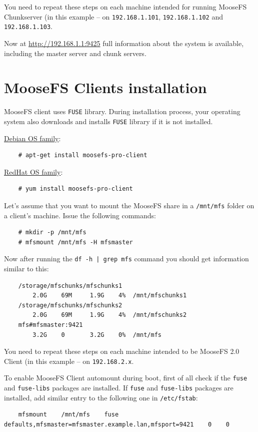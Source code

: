 \documentclass[a4paper,11pt,english]{report}
\def\code#1{\texttt{#1}}
\begin{document}
		
		\bigskip
		\bigskip
		You need to repeat these steps on each machine intended for running MooseFS Chunkserver (in this example -- on \code{192.168.1.101}, \code{192.168.1.102} and \code{192.168.1.103}.
		
		Now at \url{http://192.168.1.1:9425} full information about the system is available, including the master server and chunk servers.
		
		
		\section{MooseFS Clients installation}
		MooseFS client uses \code{FUSE} library. During installation process, your operating system also downloads and installs \code{FUSE} library if it is not installed.

		\underline{Debian OS family}:
		\begin{lstlisting}
	# apt-get install moosefs-pro-client
		\end{lstlisting}

		\underline{RedHat OS family}:
		\begin{lstlisting}
	# yum install moosefs-pro-client
		\end{lstlisting}

		Let's assume that you want to mount the MooseFS share in a \code{/mnt/mfs} folder on a client's machine. Issue the following commands:
		\begin{lstlisting}
	# mkdir -p /mnt/mfs
	# mfsmount /mnt/mfs -H mfsmaster
		\end{lstlisting}

		Now after running the \code{df -h | grep mfs} command you should get information similar to this:
		\begin{lstlisting}
	/storage/mfschunks/mfschunks1
		2.0G	69M		1.9G	4%	/mnt/mfschunks1
	/storage/mfschunks/mfschunks2
		2.0G	69M		1.9G	4%	/mnt/mfschunks2
	mfs#mfsmaster:9421
		3.2G	0		3.2G	0%	/mnt/mfs
		\end{lstlisting}
		
		You need to repeat these steps on each machine intended to be MooseFS 2.0 Client (in this example -- on \code{192.168.2.x}.
		
		To enable MooseFS Client automount during boot, first of all check if the \code{fuse} and \code{fuse-libs} packages are installed. If \code{fuse} and \code{fuse-libs} packages are installed, add similar entry to the following one in \code{/etc/fstab}:

		\begin{lstlisting}
	mfsmount    /mnt/mfs    fuse    defaults,mfsmaster=mfsmaster.example.lan,mfsport=9421    0    0 
		\end{lstlisting}
		
\end{document}
